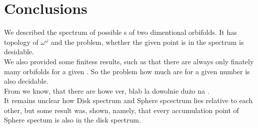 \chapter{Conclusions}

We described the spectrum of possible \Eoc s of two dimentional orbifolds. 
It has topology of $\omega^\omega$ and the problem, whether the given point is in the 
spectrum is desidable. \\

We also provided some finitess results, such as that there are always only finately many 
orbifolds for a given \Eoc. So the problem how much are for a given number is also decidable.\\

From  we know, that there are howe ver, blab la dowolnie dużo na \Eoc. \\

It remains unclear how Disk spectrum and Sphere spcectrum lies relative to each other, 
but some result was, shown, namely, that every accumulation point of Sphere spectum
is also in the disk spectrum. 




